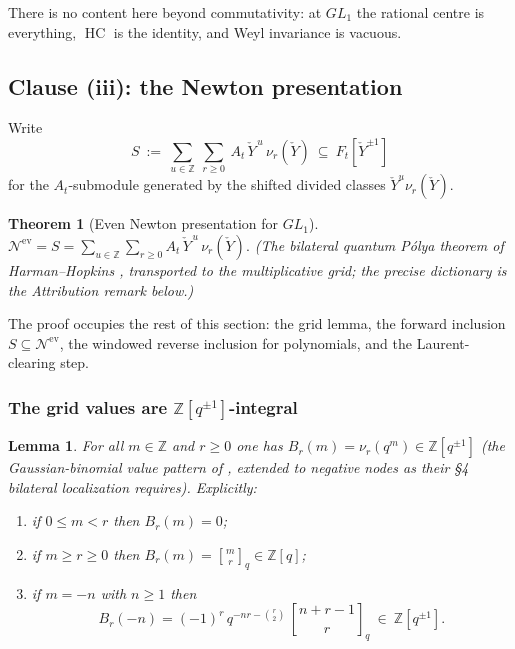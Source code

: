 \documentclass[11pt]{article}
\newtheorem{theorem}{Theorem}
\newtheorem{lemma}{Lemma}
\newcommand{\At}{A_t}
\newcommand{\Ft}{F_t}
\newcommand{\Nev}{\mathcal N^{\mathrm{ev}}}
\newcommand{\HC}{\operatorname{HC}}
\newcommand{\Yc}{\check Y}
\newcommand{\Z}{\mathbb Z}
\newcommand{\qbinom}[2]{\genfrac{[}{]}{0pt}{}{#1}{#2}_{q}}
\begin{document}
\noindent
There is no content here beyond commutativity: at $GL_1$ the rational centre is
everything, $\HC$ is the identity, and Weyl invariance is vacuous.

\subsection{Clause (iii): the Newton presentation}

Write
\[
  S\ :=\ \sum_{u\in\Z}\ \sum_{r\ge0}\ \At\,\Yc^{\,u}\,\nu_{r}(\Yc)\ \subseteq\
  \Ft[\Yc^{\pm1}]
\]
for the $\At$-submodule generated by the shifted divided classes
$\Yc^{u}\nu_r(\Yc)$.

\begin{theorem}[Even Newton presentation for $GL_1$]\label{thm:iii}
$\displaystyle \Nev=S=\sum_{u\in\Z}\sum_{r\ge0}\At\,\Yc^{\,u}\,\nu_r(\Yc).$
(The bilateral quantum P\'olya theorem of Harman--Hopkins
\cite[\S\S1,4]{HarmanHopkins}, transported to the multiplicative grid; the
precise dictionary is the Attribution remark below.)
\end{theorem}

The proof occupies the rest of this section: the grid lemma, the forward
inclusion $S\subseteq\Nev$, the windowed reverse inclusion for polynomials, and
the Laurent-clearing step.

\subsubsection{The grid values are $\Z[q^{\pm1}]$-integral}

\begin{lemma}\label{lem:grid}
For all $m\in\Z$ and $r\ge0$ one has $B_r(m)=\nu_r(q^{m})\in\Z[q^{\pm1}]$
(the Gaussian-binomial value pattern of \cite[\S1]{HarmanHopkins}, extended
to negative nodes as their \S4 bilateral localization requires).
Explicitly:
\begin{enumerate}
\item[(a)] if $0\le m<r$ then $B_r(m)=0$;
\item[(b)] if $m\ge r\ge0$ then $B_r(m)=\qbinom{m}{r}\in\Z[q]$;
\item[(c)] if $m=-n$ with $n\ge1$ then
  \[
    B_r(-n)=(-1)^{r}\,q^{-nr-\binom{r}{2}}\,\qbinom{n+r-1}{r}\ \in\ \Z[q^{\pm1}].
  \]
\end{enumerate}
\end{lemma}
\end{document}
